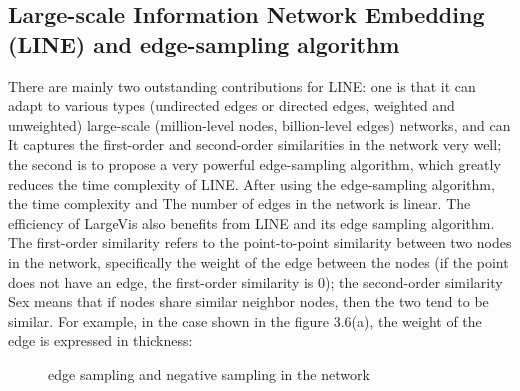 
\subsection{Large-scale Information Network Embedding (LINE) and edge-sampling algorithm}

\noindent There are mainly two outstanding contributions for LINE: one is that it can adapt to various types (undirected edges or directed edges, weighted and unweighted) large-scale (million-level nodes, billion-level edges) networks, and can It captures the first-order and second-order similarities in the network very well; the second is to propose a very powerful edge-sampling algorithm, which greatly reduces the time complexity of LINE. After using the edge-sampling algorithm, the time complexity and The number of edges in the network is linear. The efficiency of LargeVis also benefits from LINE and its edge sampling algorithm.\\

\noindent The first-order similarity refers to the point-to-point similarity between two nodes in the network, specifically the weight of the edge between the nodes (if the point does not have an edge, the first-order similarity is 0); the second-order similarity Sex means that if nodes share similar neighbor nodes, then the two tend to be similar. For example, in the case shown in the figure 3.6(a), the weight of the edge is expressed in thickness:

\begin{figure}[H]
\centering  %
\caption{edge sampling and negative sampling in the network}
\end{figure}


